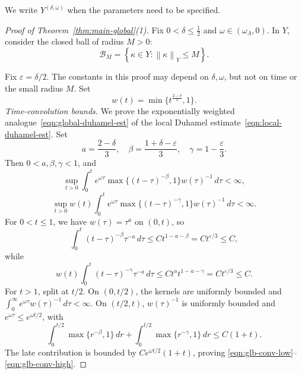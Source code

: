 \documentclass[11pt,reqno]{amsart}
\theoremstyle{plain}
\theoremstyle{definition}
\numberwithin{equation}{section}
\newcommand{\mc}[1]{\mathcal{#1}}
\newcommand{\norm}[1]{\left\lVert #1 \right\rVert}
\begin{document}
We write $Y^{(\delta,\omega)}$ when the parameters need to be specified.

\begin{proof}[Proof of Theorem~\ref{thm:main-global}(1)]
Fix $0<\delta\le\frac12$ and
$\omega\in(\omega_\Lambda,0)$. In $Y$, consider the closed ball of radius
$M>0$:
\begin{equation}\label{eqn:BM-intro}
    \mc B_M=\left\{\kappa\in Y:\norm{\kappa}_Y\le M\right\}.
\end{equation}

Fix $\varepsilon=\delta/2$. The constants in this proof may depend on
$\delta,\omega$, but not on time or the small radius $M$. Set
\begin{equation}
    w(t)=\min\{t^\frac{2-\delta}{3},1\}.
\end{equation}
\emph{Time-convolution bounds.}
We prove the exponentially weighted analogue~\eqref{eqn:global-duhamel-est}
of the local Duhamel estimate~\eqref{eqn:local-duhamel-est}. Set
\begin{equation}
    a=\frac{2-\delta}{3},\quad
    \beta=\frac{1+\delta-\varepsilon}{3},\quad
    \gamma=1-\frac{\varepsilon}{3}.
\end{equation}
Then $0<a,\beta,\gamma<1$, and
\begin{equation}\label{eqn:glb-conv-low}
    \sup_{t>0}\int_0^t e^{\omega\tau}
    \max\{(t-\tau)^{-\beta},1\}w(\tau)^{-1}\,d\tau <\infty,
\end{equation}
\begin{equation}\label{eqn:glb-conv-high}
    \sup_{t>0}w(t)\int_0^t e^{\omega\tau}
    \max\{(t-\tau)^{-\gamma},1\}w(\tau)^{-1}\,d\tau <\infty.
\end{equation}
For $0<t\le1$, we have $w(\tau)=\tau^a$ on $(0,t)$, so
\begin{equation}
    \int_0^t (t-\tau)^{-\beta}\tau^{-a}\,d\tau
    \le C t^{1-a-\beta}
    = Ct^{\varepsilon/3}\le C,
\end{equation}
while
\begin{equation}
    w(t)\int_0^t (t-\tau)^{-\gamma}\tau^{-a}\,d\tau
    \le C t^a t^{1-a-\gamma}
    = Ct^{\varepsilon/3}\le C.
\end{equation}
For $t>1$, split at $t/2$. On $(0,t/2)$, the kernels are uniformly
bounded and $\int_0^\infty e^{\omega\tau}w(\tau)^{-1}\,d\tau<\infty$.
On $(t/2,t)$, $w(\tau)^{-1}$ is uniformly bounded and
$e^{\omega\tau}\le e^{\omega t/2}$, with
\begin{equation}
    \int_0^{t/2}\max\{r^{-\beta},1\}\,dr
    +\int_0^{t/2}\max\{r^{-\gamma},1\}\,dr
    \le C(1+t).
\end{equation}
The late contribution is bounded by $Ce^{\omega t/2}(1+t)$, proving
\eqref{eqn:glb-conv-low}--\eqref{eqn:glb-conv-high}.


\end{proof}
\end{document}
